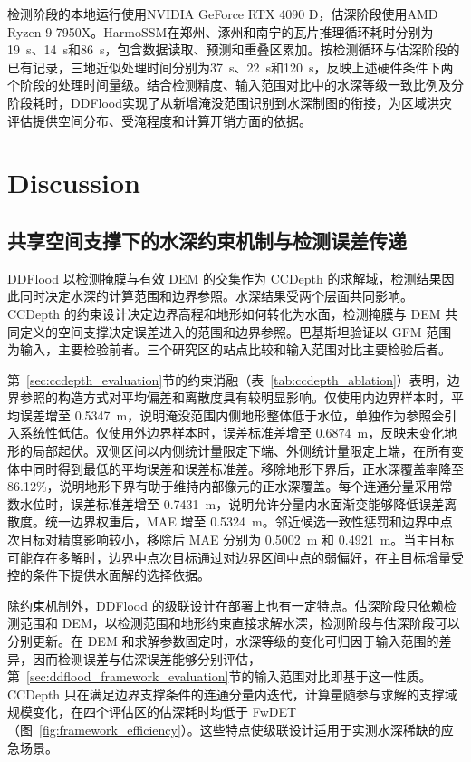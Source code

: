 \documentclass[authoryear,preprint,12pt]{elsarticle}
\begin{document}
检测阶段的本地运行使用NVIDIA GeForce RTX 4090 D，估深阶段使用AMD Ryzen 9 7950X。HarmoSSM在郑州、涿州和南宁的瓦片推理循环耗时分别为19~s、14~s和86~s，包含数据读取、预测和重叠区累加。按检测循环与估深阶段的已有记录，三地近似处理时间分别为37~s、22~s和120~s，反映上述硬件条件下两个阶段的处理时间量级。结合检测精度、输入范围对比中的水深等级一致比例及分阶段耗时，DDFlood实现了从新增淹没范围识别到水深制图的衔接，为区域洪灾评估提供空间分布、受淹程度和计算开销方面的依据。

\FloatBarrier

\section{Discussion}

\subsection{共享空间支撑下的水深约束机制与检测误差传递}

DDFlood 以检测掩膜与有效 DEM 的交集作为 CCDepth 的求解域，检测结果因此同时决定水深的计算范围和边界参照。水深结果受两个层面共同影响。CCDepth 的约束设计决定边界高程和地形如何转化为水面，检测掩膜与 DEM 共同定义的空间支撑决定误差进入的范围和边界参照。巴基斯坦验证以 GFM 范围为输入，主要检验前者。三个研究区的站点比较和输入范围对比主要检验后者。

第~\ref{sec:ccdepth_evaluation}节的约束消融（表~\ref{tab:ccdepth_ablation}）表明，边界参照的构造方式对平均偏差和离散度具有较明显影响。仅使用内边界样本时，平均误差增至 0.5347~m，说明淹没范围内侧地形整体低于水位，单独作为参照会引入系统性低估。仅使用外边界样本时，误差标准差增至 0.6874~m，反映未变化地形的局部起伏。双侧区间以内侧统计量限定下端、外侧统计量限定上端，在所有变体中同时得到最低的平均误差和误差标准差。移除地形下界后，正水深覆盖率降至 86.12\%，说明地形下界有助于维持内部像元的正水深覆盖。每个连通分量采用常数水位时，误差标准差增至 0.7431~m，说明允许分量内水面渐变能够降低误差离散度。统一边界权重后，MAE 增至 0.5324~m。邻近候选一致性惩罚和边界中点次目标对精度影响较小，移除后 MAE 分别为 0.5002~m 和 0.4921~m。当主目标可能存在多解时，边界中点次目标通过对边界区间中点的弱偏好，在主目标增量受控的条件下提供水面解的选择依据。

除约束机制外，DDFlood 的级联设计在部署上也有一定特点。估深阶段只依赖检测范围和 DEM，以检测范围和地形约束直接求解水深，检测阶段与估深阶段可以分别更新。在 DEM 和求解参数固定时，水深等级的变化可归因于输入范围的差异，因而检测误差与估深误差能够分别评估，第~\ref{sec:ddflood_framework_evaluation}节的输入范围对比即基于这一性质。CCDepth 只在满足边界支撑条件的连通分量内迭代，计算量随参与求解的支撑域规模变化，在四个评估区的估深耗时均低于 FwDET（图~\ref{fig:framework_efficiency}）。这些特点使级联设计适用于实测水深稀缺的应急场景。
\end{document}
